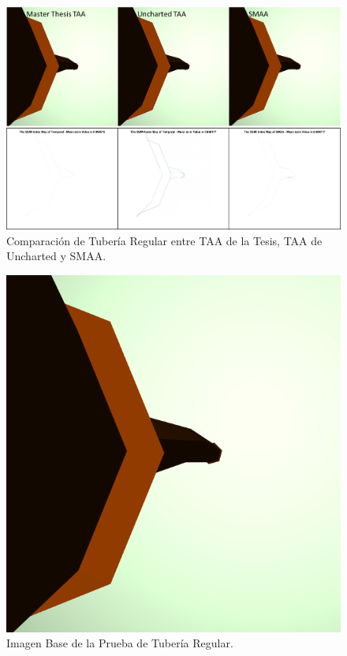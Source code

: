 \documentclass[pregrado]{tesis-usb} %
\begin{document}
\begin{figure}[!htb]
	\centering
	\includegraphics[scale=0.5]{images/results/pipe_regular.png}
	\caption{Comparación de Tubería Regular entre TAA de la Tesis, TAA de Uncharted y SMAA.}\label{fig:pipe_regular_render}
\end{figure}

\begin{figure}[!htb]
	\centering
	\includegraphics[scale=0.2]{images/results/pipe_regular_sobel_ground_truth.png}
	\caption{Imagen Base de la Prueba de Tubería Regular.}\label{fig:pipe_regular_truth}
\end{figure}
\end{document}
